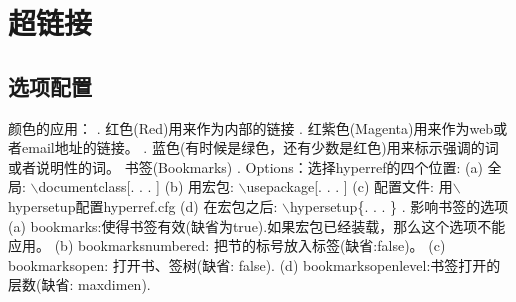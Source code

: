 \section{超链接}
\subsection{选项配置}
\textcolor[rgb]{0.50,0.00,0.50}{ 颜色的应用：} .
红色(Red)用来作为内部的链接 .
红紫色(Magenta)用来作为web或者email地址的链接。 .
蓝色(有时候是绿色，还有少数是红色)用来标示强调的词或者说明性的词。
\newline
\textcolor[rgb]{0.50,0.00,0.50}{书签(Bookmarks) }.
Options：选择hyperref的四个位置: \newline (a) 全局: $\backslash
$documentclass[. . . ] \newline (b) 用宏包: $\backslash
$usepackage[. . . ] \newline (c) 配置文件: 用$\backslash
$hypersetup配置hyperref.cfg \newline (d) 在宏包之后: $\backslash
$hypersetup{\{}. . . {\}} . 影响书签的选项 \newline (a)
bookmarks:使得书签有效(缺省为true).如果宏包已经装载，那么这个选项不能应用。
\newline
(b) bookmarksnumbered: 把节的标号放入标签(缺省:false)。 \newline (c)
bookmarksopen: 打开书、签树(缺省: false). \newline (d)
bookmarksopenlevel:书签打开的层数(缺省: maxdimen). \newline

